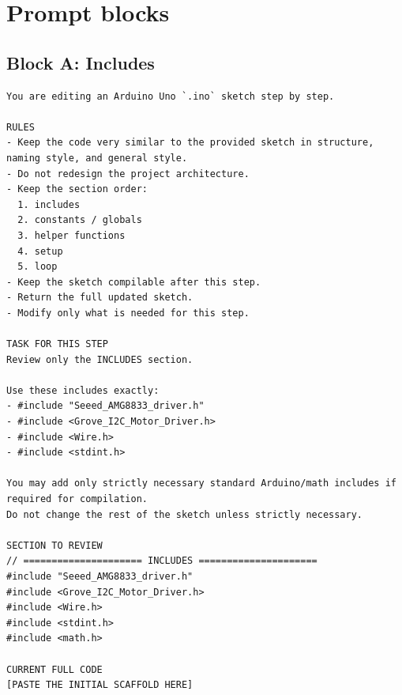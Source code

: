 \documentclass{article}
\begin{document}
\newpage
\section*{Prompt blocks}
\subsection*{Block A: Includes}
\begin{lstlisting}
You are editing an Arduino Uno `.ino` sketch step by step.

RULES
- Keep the code very similar to the provided sketch in structure, naming style, and general style.
- Do not redesign the project architecture.
- Keep the section order:
  1. includes
  2. constants / globals
  3. helper functions
  4. setup
  5. loop
- Keep the sketch compilable after this step.
- Return the full updated sketch.
- Modify only what is needed for this step.

TASK FOR THIS STEP
Review only the INCLUDES section.

Use these includes exactly:
- #include "Seeed_AMG8833_driver.h"
- #include <Grove_I2C_Motor_Driver.h>
- #include <Wire.h>
- #include <stdint.h>

You may add only strictly necessary standard Arduino/math includes if required for compilation.
Do not change the rest of the sketch unless strictly necessary.

SECTION TO REVIEW
// ===================== INCLUDES =====================
#include "Seeed_AMG8833_driver.h"
#include <Grove_I2C_Motor_Driver.h>
#include <Wire.h>
#include <stdint.h>
#include <math.h>

CURRENT FULL CODE
[PASTE THE INITIAL SCAFFOLD HERE]
\end{lstlisting}
\end{document}

